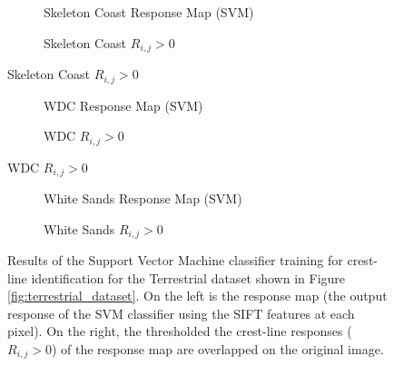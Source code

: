 \begin{figure}[H]
	\ContinuedFloat
	\centering
	\begin{subfigure}{0.48\textwidth}
		\centering
		\caption{Skeleton Coast Response Map (SVM)}
		\label{fig:SkeletonCoast_SVM_response}
	\end{subfigure}
	\begin{subfigure}{0.48\textwidth}
		\centering
		\caption{ Skeleton Coast $R_{i,j} > 0$}
		\label{fig:SkeletonCoast_SVM_response_overlay}
	\end{subfigure}
\end{figure}
\begin{figure}[H]
	\ContinuedFloat
	\centering
	\begin{subfigure}{0.48\textwidth}
		\centering
		\caption{WDC Response Map (SVM)}
		\label{fig:WDC_SVM_response}
	\end{subfigure}
	\begin{subfigure}{0.48\textwidth}
		\centering
		\caption{ WDC $R_{i,j} > 0$}
		\label{fig:WDC_SVM_response_overlay}
	\end{subfigure}
\end{figure}
\begin{figure}[H]
	\ContinuedFloat
	\centering
	\begin{subfigure}{0.48\textwidth}
		\centering
		\caption{White Sands Response Map (SVM)}
		\label{fig:WhiteSands_SVM_response}
	\end{subfigure}
	\begin{subfigure}{0.48\textwidth}
		\centering
		\caption{ White Sands $R_{i,j} > 0$}
		\label{fig:WhiteSands_SVM_response_overlay}
	\end{subfigure}
	\caption{Results of the Support Vector Machine classifier training for crest-line identification for the Terrestrial dataset shown in Figure \ref{fig:terrestrial_dataset}. On the left is the response map (the output response of the SVM classifier using the SIFT features at each pixel). On the right, the thresholded the crest-line responses ($R_{i,j} > 0$) of the response map are overlapped on the original image. }
	\label{fig:SVM_response_results}
\end{figure}

